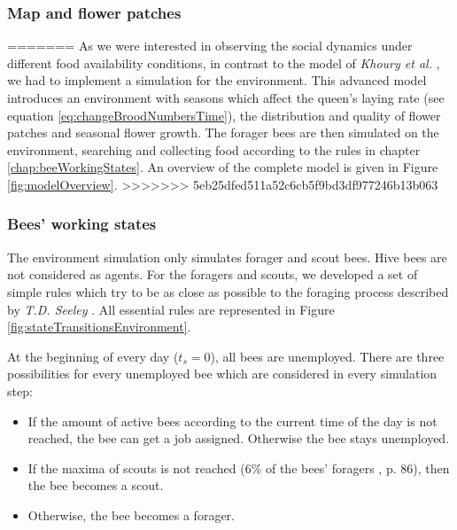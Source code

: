 		\subsubsection{Map and flower patches}
=======
		As we were interested in observing the social dynamics under different food availability conditions, in contrast to the model of \textit{Khoury et al.} \cite{khoury13}, we had to implement a simulation for the environment. This advanced model introduces an environment with seasons which affect the queen's laying rate (see equation \ref{eq:changeBroodNumbersTime}), the distribution and quality of flower patches and seasonal flower growth.
		The forager bees are then simulated on the environment, searching and collecting food according to the rules in chapter \ref{chap:beeWorkingStates}. An overview of the complete model is given in Figure \ref{fig:modelOverview}.
>>>>>>> 5eb25dfed511a52c6cb5f9bd3df977246b13b063
		
		\subsubsection{Bees' working states}
			\label{chap:beesWorkingStates}
			The environment simulation only simulates forager and scout bees. Hive bees are not considered as agents. For the foragers and scouts, we developed a set of simple rules which try to be as close as possible to the foraging process described by \textit{T.D. Seeley} \cite{seeley95}. All essential rules are represented in Figure \ref{fig:stateTransitionsEnvironment}.\\
			\label{chap:beeWorkingStates}
			
			
			At the beginning of every day ($t_s = 0$), all bees are unemployed. There are three possibilities for every unemployed bee which are considered in every simulation step:
			\begin{itemize}
				\item If the amount of active bees according to the current time of the day is not reached, the bee can get a job assigned. Otherwise the bee stays unemployed.
				\item If the maxima of scouts is not reached (6\% of the bees' foragers \cite*{seeley95}, p. 86), then the bee becomes a scout.
				\item Otherwise, the bee becomes a forager.\\
			\end{itemize}
			
